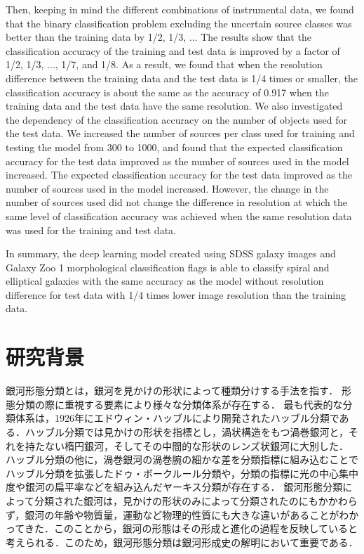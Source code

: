 \documentclass[a4j, 11pt]{jreport}
\begin{document}
Then, keeping in mind the different combinations of instrumental data, we found that the binary classification problem excluding the uncertain source classes was better than the training data by 1/2, 1/3, ... The results show that the classification accuracy of the training and test data is improved by a factor of 1/2, 1/3, ..., 1/7, and 1/8. As a result, we found that when the resolution difference between the training data and the test data is 1/4 times or smaller, the classification accuracy is about the same as the accuracy of 0.917 when the training data and the test data have the same resolution. We also investigated the dependency of the classification accuracy on the number of objects used for the test data. We increased the number of sources per class used for training and testing the model from 300 to 1000, and found that the expected classification accuracy for the test data improved as the number of sources used in the model increased.
The expected classification accuracy for the test data improved as the number of sources used in the model increased. However, the change in the number of sources used did not change the difference in resolution at which the same level of classification accuracy was achieved when the same resolution data was used for the training and test data.

In summary, the deep learning model created using SDSS galaxy images and Galaxy Zoo 1 morphological classification flags is able to classify spiral and elliptical galaxies with the same accuracy as the model without resolution difference for test data with 1/4 times lower image resolution than the training data.


\newpage
\tableofcontents       %
\thispagestyle{empty}  %
\pagebreak
{} %


\chapter{研究背景}
銀河形態分類とは，銀河を見かけの形状によって種類分けする手法を指す．
形態分類の際に重視する要素により様々な分類体系が存在する．
最も代表的な分類体系は，1926年にエドウィン・ハッブルにより開発されたハッブル分類\cite{hubble1936}である．ハッブル分類では見かけの形状を指標とし，渦状構造をもつ渦巻銀河と，それを持たない楕円銀河，そしてその中間的な形状のレンズ状銀河に大別した．
ハッブル分類の他に，渦巻銀河の渦巻腕の細かな差を分類指標に組み込むことでハッブル分類を拡張したドゥ・ボークルール分類や，分類の指標に光の中心集中度や銀河の扁平率などを組み込んだヤーキス分類が存在する．
銀河形態分類によって分類された銀河は，見かけの形状のみによって分類されたのにもかかわらず，銀河の年齢や物質量，運動など物理的性質にも大きな違いがあることがわかってきた．このことから，銀河の形態はその形成と進化の過程を反映していると考えられる．このため，銀河形態分類は銀河形成史の解明において重要である．
\end{document}
